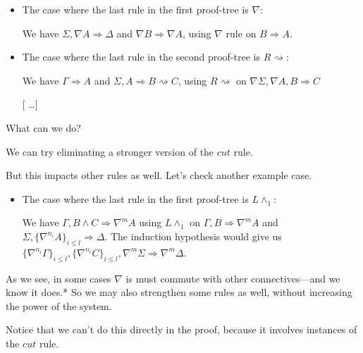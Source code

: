 \documentclass{beamer}
\begin{document}
\begin{frame}{\subAnalytic}
	\begin{block}{}
		\begin{itemize}
			\item The case where the last rule in the first proof-tree is $\nabla$:
			
			We have $\Sigma, \nabla A \Rightarrow \Delta$ and $\nabla B \Rightarrow \nabla A$, using $\nabla$ rule on $B \Rightarrow A$.
	
			\item The case where the last rule in the second proof-tree is $R \rightsquigarrow$:
			
			We have $\Gamma \Rightarrow A$ and $\Sigma, A \Rightarrow B \rightsquigarrow C$, using $R \rightsquigarrow$ on $\nabla \Sigma, \nabla A, B \Rightarrow C$

			[ \dots ]
		\end{itemize}

		\quad \small What can we do?
	\end{block}

	We can try eliminating a stronger version of the $cut$ rule.

	\begin{block}{}
		\begin{prooftree}
		\end{prooftree}
	\end{block}
\end{frame}

\begin{frame}{\subAnalytic}
	But this impacts other rules as well. Let's check another example case.
	\begin{block}{}
		\begin{itemize}
			\item The case where the last rule in the first proof-tree is $L \wedge_1$:
			
			We have $\Gamma, B \wedge C \Rightarrow \nabla^m A$ using $L \wedge_1$ on $\Gamma, B \Rightarrow \nabla^m A$ and $\Sigma , \{\nabla^{n_i} A\}_{i \leq l} \Rightarrow \Delta$. The induction hypothesis would give us $\{\nabla^{n_i} \Gamma\}_{i \leq l}, \{\nabla^{n_i} C \}_{i \leq l}, \nabla^m \Sigma \Rightarrow \nabla^m \Delta$.
		\end{itemize}
		\quad [ \dots ]
	\end{block}

	As we see, in some cases $\nabla$ is must commute with other connectives---and we know it does.* So we may also strengthen some rules as well, without increasing the power of the system.

	\small * Notice that we can't do this directly in the proof, because it involves instances of the $cut$ rule.
\end{frame}
\end{document}
